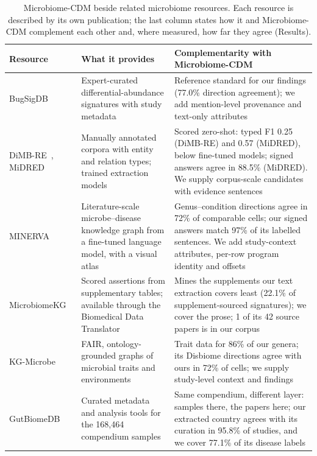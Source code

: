 \documentclass[referee,lineno,pdflatex,sn-vancouver-num]{sn-jnl}
\theoremstyle{thmstyleone}%
\theoremstyle{thmstyletwo}%
\theoremstyle{thmstylethree}%
\begin{document}
\begin{table}[!t]
\caption{Microbiome-CDM beside related microbiome resources. Each resource is
described by its own publication; the last column states how it and Microbiome-CDM complement each other and, where measured, how far they agree (Results).\label{tab:compare}}%
\footnotesize
\renewcommand{\arraystretch}{1.05}%
\tabcolsep=3pt%
\begin{tabular}{@{}>{\raggedright\arraybackslash}p{}>{\raggedright\arraybackslash}p{}>{\raggedright\arraybackslash}p{}@{}}
\toprule
Resource & What it provides & Complementarity with Microbiome-CDM \\
\midrule
BugSigDB~\cite{geistlinger2023} & Expert-curated differential-abundance signatures with study metadata & Reference standard for our findings (77.0\% direction agreement); we add mention-level provenance and text-only attributes \\
DiMB-RE~\cite{hong2025dimbre}, MiDRED~\cite{hogan2024midred} & Manually annotated corpora with entity and relation types; trained extraction models & Scored zero-shot: typed F1 0.25 (DiMB-RE) and 0.57 (MiDRED), below fine-tuned models; signed answers agree in 88.5\% (MiDRED). We supply corpus-scale candidates with evidence sentences \\
MINERVA~\cite{langarica2025minerva} & Literature-scale microbe--disease knowledge graph from a fine-tuned language model, with a visual atlas & Genus--condition directions agree in 72\% of comparable cells; our signed answers match 97\% of its labelled sentences. We add study-context attributes, per-row program identity and offsets \\
MicrobiomeKG~\cite{goetz2025microbiomekg} & Scored assertions from supplementary tables; available through the Biomedical Data Translator & Mines the supplements our text extraction covers least (22.1\% of supplement-sourced signatures); we cover the prose; 1 of its 42 source papers is in our corpus \\
KG-Microbe~\cite{santangelo2026kgmicrobe} & FAIR, ontology-grounded graphs of microbial traits and environments & Trait data for 86\% of our genera; its Disbiome directions agree with ours in 72\% of cells; we supply study-level context and findings \\
GutBiomeDB~\cite{zhai2026gutbiomedb} & Curated metadata and analysis tools for the 168,464 compendium samples & Same compendium, different layer: samples there, the papers here; our extracted country agrees with its curation in 95.8\% of studies, and we cover 77.1\% of its disease labels \\

\end{tabular}
\end{table}
\end{document}
